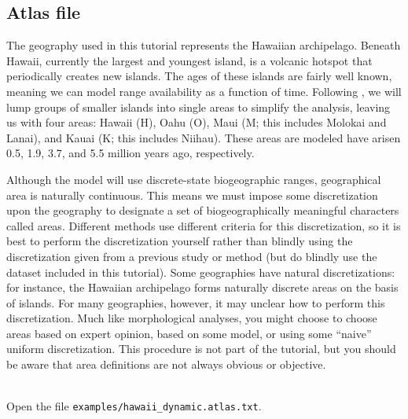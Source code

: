 \subsection{Atlas file}

The geography used in this tutorial represents the Hawaiian archipelago.
Beneath Hawaii, currently the largest and youngest island, is a volcanic hotspot that periodically creates new islands.
The ages of these islands are fairly well known, meaning we can model range availability as a function of time.
Following \citet{ree08}, we will lump groups of smaller islands into single areas to simplify the analysis, leaving us with four areas: Hawaii (H), Oahu (O), Maui (M; this includes Molokai and Lanai), and Kauai (K; this includes Niihau).
These areas are modeled have arisen 0.5, 1.9, 3.7, and 5.5 million years ago, respectively.

Although the model will use discrete-state biogeographic ranges, geographical area is naturally continuous.
This means we must impose some discretization upon the geography to designate a set of biogeographically meaningful characters called areas.
Different methods use different criteria for this discretization, so it is best to perform the discretization yourself rather than blindly using the discretization given from a previous study or method (but do blindly use the dataset included in this tutorial).
Some geographies have natural discretizations: for instance, the Hawaiian archipelago forms naturally discrete areas on the basis of islands.
For many geographies, however, it may unclear how to perform this discretization.
Much like morphological analyses, you might choose to choose areas based on expert opinion, based on some model, or using some ``naive'' uniform discretization.
This procedure is not part of the tutorial, but you should be aware that area definitions are not always obvious or objective.


\newpage

\noindent \\ \impmark  Open the file \texttt{examples/hawaii\_dynamic.atlas.txt}.

